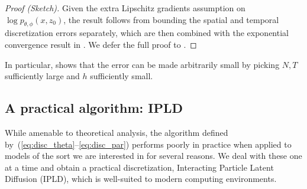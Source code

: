 \documentclass[twoside]{article}
\begin{document}
\begin{proof}[Proof (Sketch)]
Given the extra Lipschitz gradients assumption on $\log p_{\theta, \phi}(x,z_0)$, the result follows from bounding the spatial and temporal discretization errors separately, which are then combined with the exponential convergence result in . We defer the full proof to .
\end{proof}
In particular,  shows that the error can be made arbitrarily small by picking $N,T$ sufficiently large and $h$ sufficiently small.
\subsection{A practical algorithm: IPLD}\label{sec:pratical-alg}
While amenable to theoretical analysis, the algorithm defined by~(\ref{eq:disc_theta}--\ref{eq:disc_par}) performs poorly in practice when applied to models of the sort we are interested in for several reasons. We deal with these one at a time and obtain a practical discretization,  Interacting Particle Latent Diffusion (\textsc{\small IPLD}), which is well-suited to modern computing environments.
\end{document}
